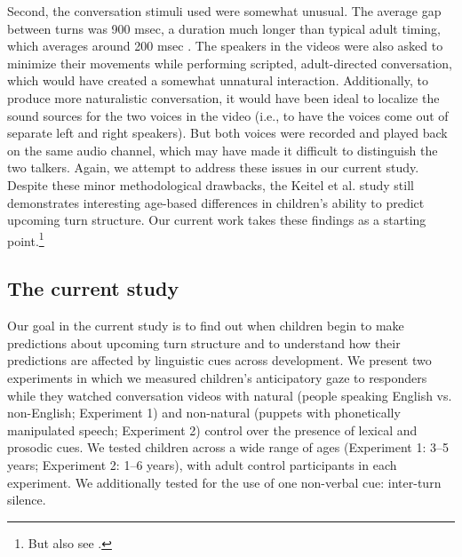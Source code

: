 \documentclass[authoryear, 12pt]{elsarticle}
\begin{document}
Second, the conversation stimuli \citet{keitel2013} used were somewhat unusual. The average gap between turns was 900 msec, a duration much longer than typical adult timing, which averages around 200 msec \citep{stivers2009}. The speakers in the videos were also asked to minimize their movements while performing scripted, adult-directed conversation, which would have created a somewhat unnatural interaction. Additionally, to produce more naturalistic conversation, it would have been ideal to localize the sound sources for the two voices in the video (i.e., to have the voices come out of separate left and right speakers). But both voices were recorded and played back on the same audio channel, which may have made it difficult to distinguish the two talkers. Again, we attempt to address these issues in our current study. Despite these minor methodological drawbacks, the Keitel et al. \citeyearpar{keitel2013} study still demonstrates interesting age-based differences in children's ability to predict upcoming turn structure. Our current work takes these findings as a starting point.\footnote{But also see \citet{casillas2012, casillas2013}.}


\subsection*{The current study}

Our goal in the current study is to find out when children begin to make predictions about upcoming turn structure and to understand how their predictions are affected by linguistic cues across development. We present two experiments in which we measured children's anticipatory gaze to responders while they watched conversation videos with natural (people speaking English vs. non-English; Experiment 1) and non-natural (puppets with phonetically manipulated speech; Experiment 2) control over the presence of lexical and prosodic cues. We tested children across a wide range of ages (Experiment 1: 3--5 years; Experiment 2: 1--6 years), with adult control participants in each experiment. We additionally tested for the use of one non-verbal cue: inter-turn silence.
\end{document}
